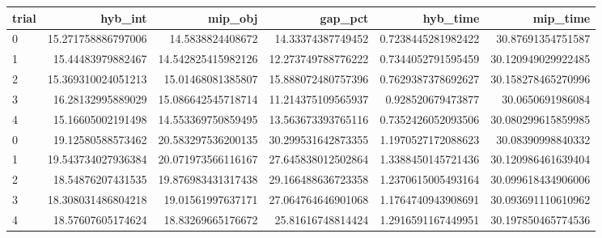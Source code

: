 \begin{tabular}{lrrrrr}
\hline
trial & hyb_int & mip_obj & gap_pct & hyb_time & mip_time \\ \hline
0 & 15.271758886797006 & 14.5838824408672 & 14.33374387749452 & 0.7238445281982422 & 30.87691354751587 \\
1 & 15.44483979882467 & 14.542825415982126 & 12.273749788776222 & 0.7344052791595459 & 30.120949029922485 \\
2 & 15.369310024051213 & 15.01468081385807 & 15.888072480757396 & 0.7629387378692627 & 30.158278465270996 \\
3 & 16.28132995889029 & 15.086642545718714 & 11.214375109565937 & 0.928520679473877 & 30.0650691986084 \\
4 & 15.16605002191498 & 14.553369750859495 & 13.563673393765116 & 0.7352426052093506 & 30.080299615859985 \\
0 & 19.12580588573462 & 20.583297536200135 & 30.299531642873355 & 1.1970527172088623 & 30.08390998840332 \\
1 & 19.543734027936384 & 20.071973566116167 & 27.645838012502864 & 1.3388450145721436 & 30.120986461639404 \\
2 & 18.54876207431535 & 19.876983431317438 & 29.166488636723358 & 1.2370615005493164 & 30.099618434906006 \\
3 & 18.308031486804218 & 19.01561997637171 & 27.064764646901068 & 1.1764740943908691 & 30.093691110610962 \\
4 & 18.57607605174624 & 18.83269665176672 & 25.81616748814424 & 1.2916591167449951 & 30.197850465774536 \\
\hline
\end{tabular}
